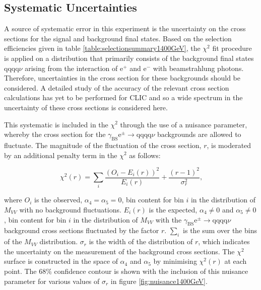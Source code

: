 
\subsection{Systematic Uncertainties}
A source of systematic error in this experiment is the uncertainty on the cross sections for the signal and background final states.  Based on the selection efficiencies given in table \ref{table:selectionsummary1400GeV}, the $\chi^{2}$ fit procedure is applied on a distribution that primarily consists of the background final states $\text{qqqq}\nu$ arising from the interaction of $\text{e}^{+}$ and $\text{e}^{-}$ with beamstrahlung photons.  Therefore, uncertainties in the cross section for these backgrounds should be considered.  A detailed study of the accuracy of the relevant cross section calculations has yet to be performed for CLIC and so a wide spectrum in the uncertainty of these cross sections is considered here.   

This systematic is included in the $\chi^{2}$ through the use of a nuisance parameter, whereby the cross section for the $\gamma_{\text{BS}}\text{e}^{\pm} \rightarrow \text{qqqq}\nu$ backgrounds are allowed to fluctuate.  The magnitude of the fluctuation of the cross section, $r$, is moderated by an additional penalty term in the $\chi^{2}$ as follows:

\begin{equation}
\chi^{2}(r) = \sum_{i} \frac{(O_{i} - E_{i}(r))^{2}}{E_{i}(r)} + \frac{(r-1)^{2}}{\sigma_{r}^{2}} \text{,}
\end{equation}

\noindent where $O_{i}$ is the observed, $\alpha_{4} = \alpha_{5} = 0$, bin content for bin $i$ in the distribution of $M_{VV}$ with no background fluctuations.  $E_{i}(r)$ is the expected, $\alpha_{4} \neq 0$ and $\alpha_{5} \neq 0$, bin content for bin $i$ in the distribution of $M_{VV}$ with the $\gamma_{\text{BS}}\text{e}^{\pm} \rightarrow \text{qqqq}\nu$ background cross sections fluctuated by the factor $r$.  $\sum_{i}$ is the sum over the bins of the $M_{VV}$ distribution.  $\sigma_{r}$ is the width of the distribution of $r$, which indicates the uncertainty on the measurement of the background cross sections.  The $\chi^{2}$ surface is constructed in the space of $\alpha_{4}$ and $\alpha_{5}$ by minimising $\chi^{2}(r)$ at each point.  The 68\% confidence contour is shown with the inclusion of this nuisance parameter for various values of $\sigma_{r}$ in figure \ref{fig:nuisance1400GeV}.   

